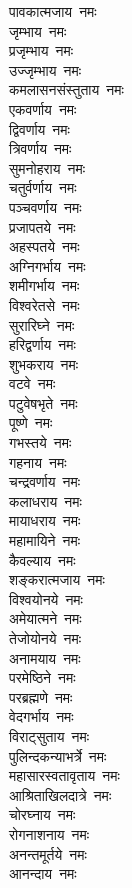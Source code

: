 \begin{multicols}{2}
\begin{flushleft}
पावकात्मजाय~नमः\\
जृम्भाय~नमः\\
प्रजृम्भाय~नमः\\
उज्जृम्भाय~नमः\\
कमलासनसंस्तुताय~नमः\\
एकवर्णाय~नमः\\
द्विवर्णाय~नमः\\
त्रिवर्णाय~नमः\\
सुमनोहराय~नमः\\
चतुर्वर्णाय~नमः\hfill{}\\
पञ्चवर्णाय~नमः\\
प्रजापतये~नमः\\
अहस्पतये~नमः\\
अग्निगर्भाय~नमः\\
शमीगर्भाय~नमः\\
विश्वरेतसे~नमः\\
सुरारिघ्ने~नमः\\
हरिद्वर्णाय~नमः\\
शुभकराय~नमः\\
वटवे~नमः\hfill{}\\
पटुवेषभृते~नमः\\
पूष्णे~नमः\\
गभस्तये~नमः\\
गहनाय~नमः\\
चन्द्रवर्णाय~नमः\\
कलाधराय~नमः\\
मायाधराय~नमः\\
महामायिने~नमः\\
कैवल्याय~नमः\\
शङ्करात्मजाय~नमः\hfill{}\\
विश्वयोनये~नमः\\
अमेयात्मने~नमः\\
तेजोयोनये~नमः\\
अनामयाय~नमः\\
परमेष्ठिने~नमः\\
परब्रह्मणे~नमः\\
वेदगर्भाय~नमः\\
विराट्सुताय~नमः\\
पुलिन्दकन्याभर्त्रे~नमः\\
महासारस्वतावृताय~नमः\hfill{}\\
आश्रिताखिलदात्रे~नमः\\
चोरघ्नाय~नमः\\
रोगनाशनाय~नमः\\
अनन्तमूर्तये~नमः\\
आनन्दाय~नमः\\

\end{flushleft}
\end{multicols}
